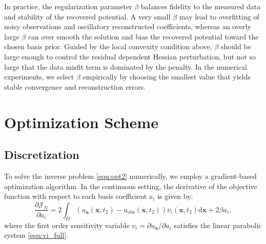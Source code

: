 \documentclass[11pt,reqno]{amsart}
\begin{document}
In practice, the regularization parameter $\beta$ balances fidelity to the measured data and stability of the recovered potential. A very small $\beta$ may lead to overfitting of noisy observations and oscillatory reconstructed coefficients, whereas an overly large $\beta$ can over smooth the solution and bias the recovered potential toward the chosen basis prior. Guided by the local convexity condition above, $\beta$ should be large enough to control the residual dependent Hessian perturbation, but not so large that the data misfit term is dominated by the penalty. In the numerical experiments, we select $\beta$ empirically by choosing the smallest value that yields stable convergence and reconstruction errors.

\section{Optimization Scheme}
\subsection{Discretization}

To solve the inverse problem \eqref{equ:opt2} numerically, we employ a gradient-based optimization algorithm. In the continuous setting, the derivative of the objective function with respect to each basis coefficient $a_i$ is given by:
\begin{equation}
	\label{equ:continuous_gradient}
	\frac{\partial \mathcal{J}_{N}}{\partial a_i} = 2\int_{\Omega}(u_{\mathbf{a}}(\mathbf{x},t_2) - u_{\text{obs}}(\mathbf{x},t_2))v_i(\mathbf{x},t_2)\mathrm{d}\mathbf{x} + 2\beta a_i,  
\end{equation}
where the first order sensitivity variable $v_i = \partial u_{\mathbf{a}} / \partial a_i$ satisfies the linear parabolic system \eqref{equ:vi_full}.
\end{document}
